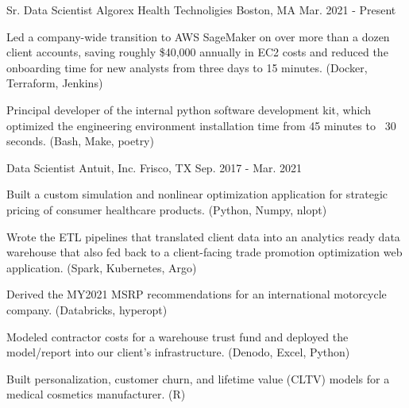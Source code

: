 

\begin{cventries}

  \cventry
    {Sr. Data Scientist} %
    {Algorex Health Technoligies} %
    {Boston, MA} %
    {Mar. 2021 - Present} %
    {
      \begin{cvitems} %
      \item {Led a company-wide transition to AWS SageMaker on over
          more than a dozen client accounts, saving roughly \$40,000
          annually in EC2 costs and reduced the onboarding time for
          new analysts from three days to 15 minutes. (Docker, Terraform, Jenkins)}
      \item {Principal developer of the internal python software
          development kit, which optimized the engineering environment
          installation time from 45 minutes to ~30 seconds. (Bash, Make, poetry)}
      \end{cvitems}
    }

  \cventry
    {Data Scientist} %
    {Antuit, Inc.} %
    {Frisco, TX} %
    {Sep. 2017 - Mar. 2021} %
    {
      \begin{cvitems} %
      \item {Built a custom simulation and nonlinear optimization
          application for strategic pricing of consumer healthcare
          products. (Python, Numpy, nlopt)}
      \item {Wrote the ETL pipelines that translated client data into
          an analytics ready data warehouse that also fed back to a
          client-facing trade promotion optimization web
          application. (Spark, Kubernetes, Argo) }
      \item {Derived the MY2021 MSRP recommendations for an
          international motorcycle company. (Databricks, hyperopt)}
      \item {Modeled contractor costs for a warehouse trust fund and
          deployed the model/report into our client's
          infrastructure. (Denodo, Excel, Python)}
      \item {Built personalization, customer churn, and lifetime value
          (CLTV) models for a medical cosmetics manufacturer. (R)}
      \end{cvitems}
    }

\end{cventries}
